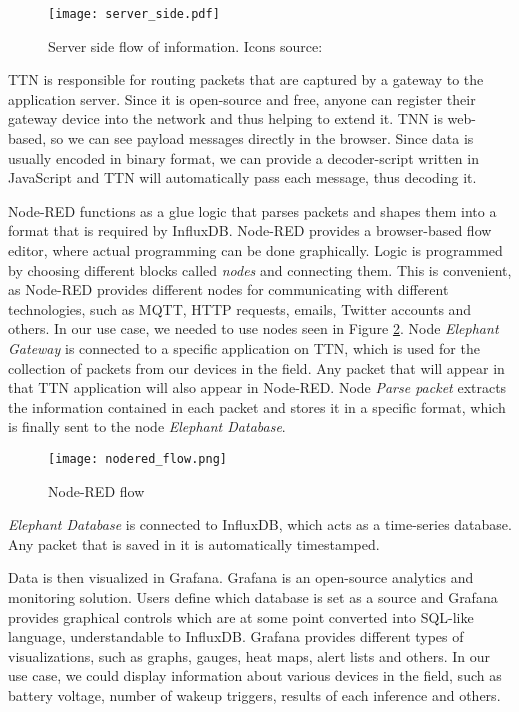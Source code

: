 \begin{figure}[ht]
    \centering
    \texttt{[image: server\_side.pdf]} 
    \caption[Server side flow of information.]{Server side flow of information. Icons source:\cite{icons}}
    \label{server_side}
\end{figure}

TTN is responsible for routing packets that are captured by a gateway to the application server.
Since it is open-source and free, anyone can register their gateway device into the network and thus helping to extend it.
TNN is web-based, so we can see payload messages directly in the browser.
Since data is usually encoded in binary format, we can provide a decoder-script written in JavaScript and TTN will automatically pass each message, thus decoding it.

Node-RED functions as a glue logic that parses packets and shapes them into a format that is required by InfluxDB.
Node-RED provides a browser-based flow editor, where actual programming can be done graphically.
Logic is programmed by choosing different blocks called \textit{nodes} and connecting them.
This is convenient, as Node-RED provides different nodes for communicating with different technologies, such as MQTT, HTTP requests, emails, Twitter accounts and others.
In our use case, we needed to use nodes seen in Figure \ref{nodered_flow}.
Node \textit{Elephant Gateway} is connected to a specific application on TTN, which is used for the collection of packets from our devices in the field.
Any packet that will appear in that TTN application will also appear in Node-RED.
Node \textit{Parse packet} extracts the information contained in each packet and stores it in a specific format, which is finally sent to the node \textit{Elephant Database}.

\begin{figure}[ht]
    \centering
    \texttt{[image: nodered\_flow.png]} 
    \caption{ Node-RED flow}
    \label{nodered_flow}
\end{figure}

\textit{Elephant Database} is connected to InfluxDB, which acts as a time-series database.
Any packet that is saved in it is automatically timestamped.

Data is then visualized in Grafana. 
Grafana is an open-source analytics and monitoring solution.
Users define which database is set as a source and Grafana provides graphical controls which are at some point converted into SQL-like language, understandable to InfluxDB.
Grafana provides different types of visualizations, such as graphs, gauges, heat maps, alert lists and others.
In our use case, we could display information about various devices in the field, such as battery voltage, number of wakeup triggers, results of each inference and others.

